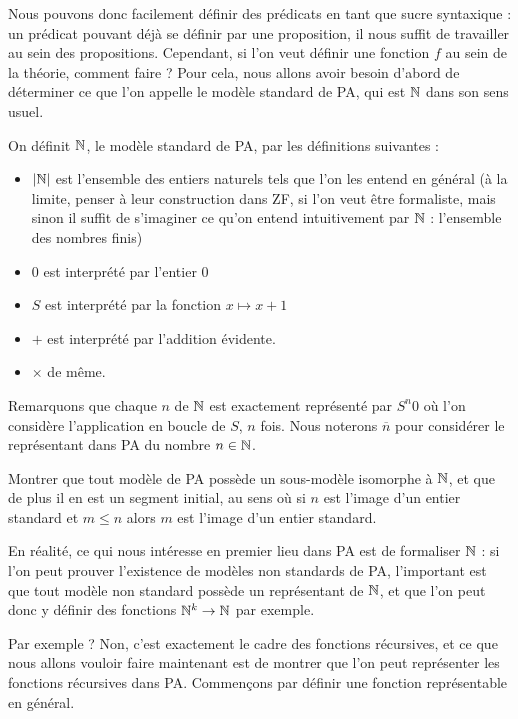 Nous pouvons donc facilement définir des prédicats en tant que sucre syntaxique : un prédicat pouvant déjà se définir par une proposition, il nous suffit de travailler au sein des propositions. Cependant, si l'on veut définir une fonction $f$ au sein de la théorie, comment faire ? Pour cela, nous allons avoir besoin d'abord de déterminer ce que l'on appelle le modèle standard de PA, qui est $\mathbb{N}$ dans son sens usuel.

\begin{defi}
    On définit $\mathbb{N}$, le modèle standard de PA, par les définitions suivantes :
    \begin{itemize}[label=$\bullet$]
        \item $|\mathbb{N}|$ est l'ensemble des entiers naturels tels que l'on les entend en général (à la limite, penser à leur construction dans ZF, si l'on veut être formaliste, mais sinon il suffit de s'imaginer ce qu'on entend intuitivement par $\mathbb{N}$ : l'ensemble des nombres finis)
        \item $0$ est interprété par l'entier $0$
        \item $S$ est interprété par la fonction $x\mapsto x+1$
        \item $+$ est interprété par l'addition évidente.
        \item $\times$ de même.
    \end{itemize}
    Remarquons que chaque $n$ de $\mathbb{N}$ est exactement représenté par $S^n0$ où l'on considère l'application en boucle de $S$, $n$ fois. Nous noterons $\overline n$ pour considérer le représentant dans PA du nombre $n\in \mathbb{N}$.
\end{defi}

\begin{exo}
    Montrer que tout modèle de PA possède un sous-modèle isomorphe à $\mathbb{N}$, et que de plus il en est un segment initial, au sens où si $n$ est l'image d'un entier standard et $m\leq n$ alors $m$ est l'image d'un entier standard.
\end{exo}

En réalité, ce qui nous intéresse en premier lieu dans PA est de formaliser $\mathbb{N}$ : si l'on peut prouver l'existence de modèles non standards de PA, l'important est que tout modèle non standard possède un représentant de $\mathbb{N}$, et que l'on peut donc y définir des fonctions $\mathbb{N}^k\to\mathbb{N}$ par exemple.

Par exemple ? Non, c'est exactement le cadre des fonctions récursives, et ce que nous allons vouloir faire maintenant est de montrer que l'on peut représenter les fonctions récursives dans PA. Commençons par définir une fonction représentable en général.

